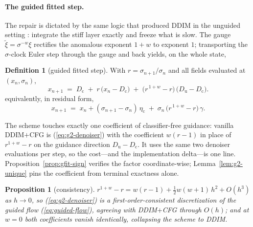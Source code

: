 \documentclass{article} %
\def\eqref#1{equation~\ref{#1}}
\theoremstyle{plain}
\newtheorem{proposition}{Proposition}
\theoremstyle{definition}
\newtheorem{definition}{Definition}
\theoremstyle{remark}
\providecommand{\eexp}{\mathrm{e}}
\providecommand{\Dc}{D_{\mathrm{c}}}
\providecommand{\Du}{D_{\mathrm{u}}}
\providecommand{\etac}{\eta_{\mathrm{c}}}
\def\eqref#1{(\ref{#1})}
\newif\ifarxiv
\begin{document}
\paragraph{The guided fitted step.}
The repair is dictated by the same logic that produced DDIM in the
unguided setting \citep{ap2026}: integrate the stiff layer exactly and
freeze what is slow. The
gauge $\tilde\xi = \sigma^{-w}\xi$ rectifies the anomalous exponent $1+w$
to exponent $1$; transporting the $\sigma$-clock Euler step through the
gauge and back yields, on the whole state,

\begin{definition}[guided fitted step]\label{defn:gfitted}
With $r = \sigma_{n+1}/\sigma_n$ and all fields evaluated at
$(x_n,\sigma_n)$,
\begin{equation}\label{eq:g2-denoiser}
  x_{n+1}
  \;=\;
  \Dc \;+\; r\,\bigl(x_n - \Dc\bigr)
  \;+\; \bigl(r^{\,1+w} - r\bigr)\,\bigl(\Du - \Dc\bigr) .
\end{equation}
equivalently, in residual form,
\begin{equation}\label{eq:g2-residual}
  x_{n+1}
  \;=\;
  x_n + (\sigma_{n+1}-\sigma_n)\,\etac
  \;+\; \sigma_n\,\bigl(r^{\,1+w}-r\bigr)\,\gamma .
\end{equation}
\end{definition}

The scheme touches exactly one coefficient of classifier-free guidance:
vanilla DDIM$+$CFG is \eqref{eq:g2-denoiser} with the coefficient
$w(r-1)$ in place of $r^{1+w}-r$ on the guidance direction $\Du - \Dc$. It
uses the same two denoiser evaluations per step, so the cost---and the
implementation delta---is one line.
Proposition~\ref{prop:gfit-sign} verifies the factor coordinate-wise;
Lemma~\ref{lem:g2-unique} pins the coefficient from terminal exactness alone.

\begin{proposition}[consistency]\label{prop:gconsist}
$r^{1+w} - r = w(r-1) + \tfrac12 w(w+1)\,h^2 + O(h^3)$ as $h \to 0$, so
\eqref{eq:g2-denoiser} is a first-order-consistent discretization of the
guided flow \eqref{eq:guided-flow}, agreeing with DDIM$+$CFG through
$O(h)$; and at $w = 0$ both coefficients vanish identically, collapsing the
scheme to DDIM.
\end{proposition}

\newcommand{\ProofGConsist}{%
$r^{1+w} - r = \eexp^{-(1+w)h} - \eexp^{-h}$ and $w(r-1) = w(\eexp^{-h}-1)$;
both are $-wh + O(h^2)$, and expanding to second order,
$r^{1+w}-r-w(r-1) = \eexp^{-(1+w)h}-(1+w)\eexp^{-h}+w = \tfrac12 w(w+1)h^2 + O(h^3)$.
}
\ifarxiv\begin{proof}\ProofGConsist\end{proof}\fi
\end{document}
